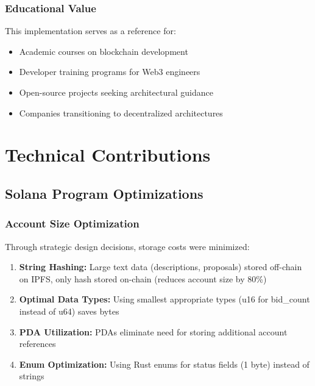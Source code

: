 \documentclass[a4paper,13pt,twoside]{report}
\theoremstyle{definition}
\begin{document}
\subsubsection{Educational Value}

This implementation serves as a reference for:

\begin{itemize}
    \item Academic courses on blockchain development
    \item Developer training programs for Web3 engineers
    \item Open-source projects seeking architectural guidance
    \item Companies transitioning to decentralized architectures
\end{itemize}

\section{Technical Contributions}

\subsection{Solana Program Optimizations}

\subsubsection{Account Size Optimization}

Through strategic design decisions, storage costs were minimized:

\begin{enumerate}
    \item \textbf{String Hashing:} Large text data (descriptions, proposals) stored off-chain on IPFS, only hash stored on-chain (reduces account size by 80\%)

    \item \textbf{Optimal Data Types:} Using smallest appropriate types (u16 for bid\_count instead of u64) saves bytes

    \item \textbf{PDA Utilization:} PDAs eliminate need for storing additional account references

    \item \textbf{Enum Optimization:} Using Rust enums for status fields (1 byte) instead of strings
\end{enumerate}
\end{document}
